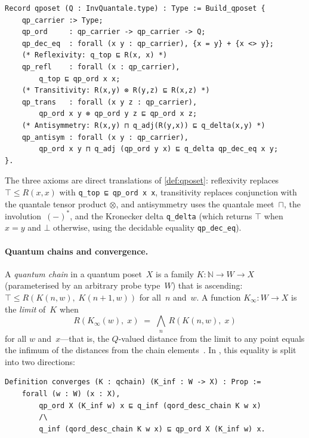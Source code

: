 \begin{lstlisting}[caption={The \texttt{qposet} record (\texttt{QuantumStructure.v}).},
                    label={lst:qposet}]
Record qposet (Q : InvQuantale.type) : Type := Build_qposet {
    qp_carrier :> Type;
    qp_ord     : qp_carrier -> qp_carrier -> Q;
    qp_dec_eq  : forall (x y : qp_carrier), {x = y} + {x <> y};
    (* Reflexivity: q_top ⊑ R(x, x) *)
    qp_refl    : forall (x : qp_carrier),
        q_top ⊑ qp_ord x x;
    (* Transitivity: R(x,y) ⊗ R(y,z) ⊑ R(x,z) *)
    qp_trans   : forall (x y z : qp_carrier),
        qp_ord x y ⊗ qp_ord y z ⊑ qp_ord x z;
    (* Antisymmetry: R(x,y) ⊓ q_adj(R(y,x)) ⊑ q_delta(x,y) *)
    qp_antisym : forall (x y : qp_carrier),
        qp_ord x y ⊓ q_adj (qp_ord y x) ⊑ q_delta qp_dec_eq x y;
}.
\end{lstlisting}

\noindent
The three axioms are direct translations of
\cref{def:qposet}: reflexivity replaces
$\top \leq R(x, x)$ with \lstinline{q_top ⊑ qp_ord x x},
transitivity replaces conjunction with the quantale tensor product
$\otimes$, and antisymmetry uses the quantale meet~$\sqcap$, the
involution~$(-)^*$, and the Kronecker delta \texttt{q\_delta}
(which returns $\top$ when $x = y$ and $\bot$ otherwise,
using the decidable equality \texttt{qp\_dec\_eq}).

\paragraph{Quantum chains and convergence.}
A \emph{quantum chain} in a quantum poset~$X$ is a family
$K : \mathbb{N} \to W \to X$ (parameterised by an arbitrary probe
type~$W$) that is ascending:
$\top \leq R(K(n, w),\; K(n{+}1, w))$ for all~$n$ and~$w$.
A function $K_\infty : W \to X$ is the \emph{limit} of~$K$ when
\[
  R(K_\infty(w),\; x) \;=\; \textstyle\bigwedge_n\, R(K(n, w),\; x)
\]
for all $w$ and~$x$---that is, the $Q$-valued distance from the limit
to any point equals the infimum of the distances from the chain
elements~\cite[Definition~3.1.1]{KLM2024}.
In \Rocq{}, this equality is split into two directions:

\begin{lstlisting}[caption={Quantum-chain convergence (\texttt{qCPO.v}).},
                    label={lst:converges}]
Definition converges (K : qchain) (K_inf : W -> X) : Prop :=
    forall (w : W) (x : X),
        qp_ord X (K_inf w) x ⊑ q_inf (qord_desc_chain K w x)
        /\
        q_inf (qord_desc_chain K w x) ⊑ qp_ord X (K_inf w) x.
\end{lstlisting}

